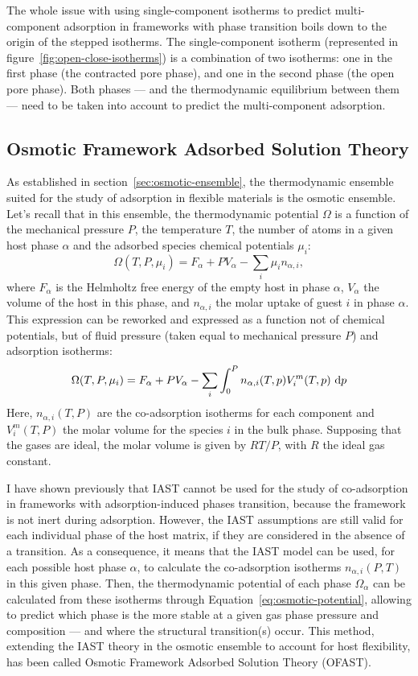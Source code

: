 \documentclass[thesis]{subfiles}
\begin{document}
The whole issue with using single-component isotherms to predict multi-component
adsorption in frameworks with phase transition boils down to the origin of the
stepped isotherms. The single-component isotherm (represented in
figure~\ref{fig:open-close-isotherms}) is a combination of two isotherms: one in
the first phase (the contracted pore phase), and one in the second phase (the
open pore phase). Both phases --- and the thermodynamic equilibrium between them
--- need to be taken into account to predict the multi-component adsorption.

\subsection{Osmotic Framework Adsorbed Solution Theory}

As established in section~\ref{sec:osmotic-ensemble}, the thermodynamic ensemble
suited for the study of adsorption in flexible materials is the osmotic
ensemble. Let's recall that in this ensemble, the thermodynamic potential
$\Omega$ is a function of the mechanical pressure $P$, the temperature $T$, the
number of atoms in a given host phase $\alpha$ and the adsorbed species chemical
potentials $\mu_i$:
\[\Omega(T, P, \mu_i) = F_\alpha + P V_\alpha - \sum_i \mu_i n_{\alpha,i},\]
where $F_\alpha$ is the Helmholtz free energy of the empty host in phase
$\alpha$, $V_\alpha$ the volume of the host in this phase, and $n_{\alpha,i}$
the molar uptake of guest $i$ in phase $\alpha$. This expression can be reworked
and expressed as a function not of chemical potentials, but of fluid pressure
(taken equal to mechanical pressure $P$) and adsorption
isotherms:\cite{Coudert2008}
\[ \label{eq:osmotic-potential}\Omega(T, P, \mu_i) = F_\alpha + P V_\alpha - \sum_i \int_0^P n_{\alpha,i}(T, p) V^m_i(T, p) \ \d p\]
Here, $n_{\alpha,i}(T, P)$ are the co-adsorption isotherms for each component and
$V^m_i(T, P)$ the molar volume for the species $i$ in the bulk phase. Supposing
that the gases are ideal, the molar volume is given by $RT/P$, with $R$ the
ideal gas constant.

I have shown previously that IAST cannot be used for the study of co-adsorption
in frameworks with adsorption-induced phases transition, because the framework
is not inert during adsorption. However, the IAST assumptions are still valid
for each individual phase of the host matrix, if they are considered in the
absence of a transition. As a consequence, it means that the IAST model can be
used, for each possible host phase $\alpha$, to calculate the co-adsorption
isotherms $n_{\alpha,i}(P,T)$ in this given phase. Then, the thermodynamic
potential of each phase $\Omega_{\alpha}$ can be calculated from these isotherms
through Equation~\eqref{eq:osmotic-potential}, allowing to predict which phase
is the more stable at a given gas phase pressure and composition --- and where
the structural transition(s) occur. This method, extending the IAST theory in
the osmotic ensemble to account for host flexibility, has been called Osmotic
Framework Adsorbed Solution Theory (OFAST)\cite{Coudert2009, Coudert2010}.
\end{document}
